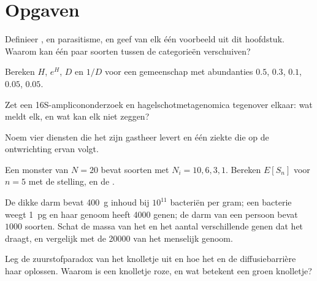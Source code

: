\section{Opgaven}

\begin{exercise}[$\star$]\label{exo:b3:microbiomes:1}
Definieer ,  en parasitisme, en geef van elk één
voorbeeld uit dit hoofdstuk. Waarom kan één paar soorten tussen de
categorieën verschuiven?
\end{exercise}

\begin{exercise}[$\star$]\label{exo:b3:microbiomes:2}
Bereken $H$, $e^{H}$, $D$ en $1/D$ voor een gemeenschap met abundanties
$0.5$, $0.3$, $0.1$, $0.05$, $0.05$.
\end{exercise}

\begin{exercise}[$\star$]\label{exo:b3:microbiomes:3}
Zet een 16S-amplicononderzoek en hagelschotmetagenomica tegenover
elkaar: wat meldt elk, en wat kan elk niet zeggen?
\end{exercise}

\begin{exercise}[$\star$]\label{exo:b3:microbiomes:4}
Noem vier diensten die het  zijn gastheer levert en één
ziekte die op de ontwrichting ervan volgt.
\end{exercise}

\begin{exercise}[$\star\star$]\label{exo:b3:microbiomes:5}
Een monster van $N = 20$  bevat soorten met $N_{i} = 10, 6, 3, 1$.
Bereken $E[S_{n}]$ voor $n = 5$ met de stelling, en de .
\end{exercise}

\begin{exercise}[$\star\star$]\label{exo:b3:microbiomes:6}
De dikke darm bevat \qty{400}{g} inhoud bij $10^{11}$ bacteriën per
gram; een bacterie weegt \qty{1}{pg} en haar genoom heeft \num{4000}
genen; de darm van een persoon bevat $1000$ soorten. Schat de massa van
het  en het aantal verschillende genen dat het draagt, en
vergelijk met de \num{20000} van het menselijk genoom.
\end{exercise}

\begin{exercise}[$\star\star$]\label{exo:b3:microbiomes:7}
Leg de zuurstofparadox van het knolletje uit en hoe het 
en de diffusiebarrière haar oplossen. Waarom is een knolletje roze, en
wat betekent een groen knolletje?
\end{exercise}

